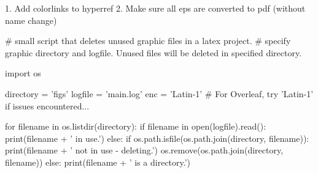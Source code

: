 
1. Add colorlinks to hyperref
2. Make sure all eps are converted to pdf (without name change)


# small script that deletes unused graphic files in a latex project.
# specify graphic directory and logfile. Unused files will be deleted in specified directory.

import os

directory = 'figs'
logfile = 'main.log'
enc = 'Latin-1' # For Overleaf, try 'Latin-1' if issues encountered...

for filename in os.listdir(directory):
    if filename in open(logfile).read():
        print(filename + ' in use.')
    else:
        if os.path.isfile(os.path.join(directory, filename)):
            print(filename + ' not in use - deleting.')
            os.remove(os.path.join(directory, filename))
        else:
            print(filename + ' is a directory.')